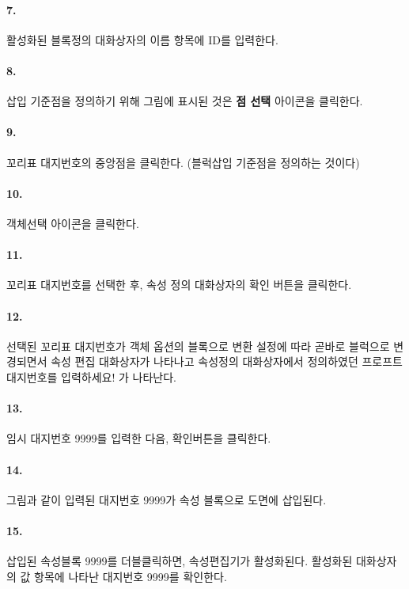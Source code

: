 \documentclass[12pt,a4paper,oneside]{book}
\begin{document}
	\paragraph {7.} 
	활성화된 블록정의 대화상자의 이름 항목에 ID를 입력한다.


	\paragraph {8.} 
	삽입 기준점을 정의하기 위해 그림에 표시된 것은 \textbf{점 선택} 아이콘을 클릭한다.



	\paragraph {9.} 
	꼬리표 대지번호의 중앙점을 클릭한다. (블럭삽입 기준점을 정의하는 것이다)


	\paragraph {10.} 
	객체선택 아이콘을 클릭한다.



	\paragraph {11.} 
	꼬리표 대지번호를 선택한 후, 속성 정의 대화상자의 확인 버튼을 클릭한다.



	\paragraph {12.} 
	선택된 꼬리표 대지번호가 객체 옵션의 블록으로 변환 설정에 따라 곧바로 블럭으로 변경되면서 
	속성 편집 대화상자가 나타나고 속성정의 대화상자에서 정의하였던 프로프트 대지번호를 입력하세요! 가 나타난다.


	\paragraph {13.} 
	임시 대지번호 9999를 입력한 다음, 확인버튼을 클릭한다.

	\paragraph {14.} 
	그림과 같이 입력된 대지번호 9999가 속성 블록으로 도면에 삽입된다.

	\paragraph {15.} 
	삽입된 속성블록 9999를 더블클릭하면, 속성편집기가 활성화된다. 
	활성화된 대화상자의 값 항목에 나타난 대지번호 9999를 확인한다.
\end{document}
